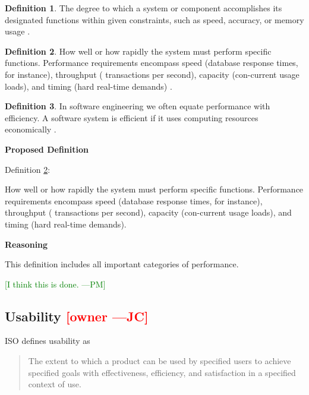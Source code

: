 \documentclass[letterpaper,cleveref]{lipics-v2019}
\newcommand{\authornote}[3]{\textcolor{#1}{[#3 ---#2]}}
\newcommand{\authornote}[3]{}
\newcommand{\jc}[1]{\authornote{red}{JC}{#1}} %
\newcommand{\pmi}[1]{\authornote{green}{PM}{#1}} %
\theoremstyle{definition}
\newtheorem{defn}{Definition}
\begin{document}
\begin{defn}
The degree to which a system or component accomplishes its designated functions
within given constraints, such as speed, accuracy, or memory usage
\citep{IEEEStdGlossarySET1990}.
\end{defn}
\begin{defn} \label{PerformanceDefnSelected}
How well or how rapidly the system must perform specific functions. Performance
requirements encompass speed (database response times, for instance), throughput
( transactions per second), capacity (con-current usage loads), and timing (hard
real-time demands) \citep{wiegers2003softreq}.
\end{defn}
\begin{defn}
In software engineering we often equate performance with efficiency. A software
system is efficient if it uses computing resources economically
\citep{ghezzi1991fundamentals}.
\end{defn}

\noindent \textbf{Proposed Definition}

Definition \ref{PerformanceDefnSelected}:

How well or how rapidly the system must perform specific functions. Performance
requirements encompass speed (database response times, for instance), throughput
( transactions per second), capacity (con-current usage loads), and timing (hard
real-time demands).

\noindent \textbf{Reasoning}

This definition includes all important categories of performance. 

\pmi{I think this is done.}

\subsection{Usability \jc{owner}} 

ISO defines usability as
\begin{quote}
The extent to which a product can be used by specified users to achieve
specified goals with effectiveness, efficiency, and satisfaction in a specified
context of use.
\end{quote}
\end{document}
